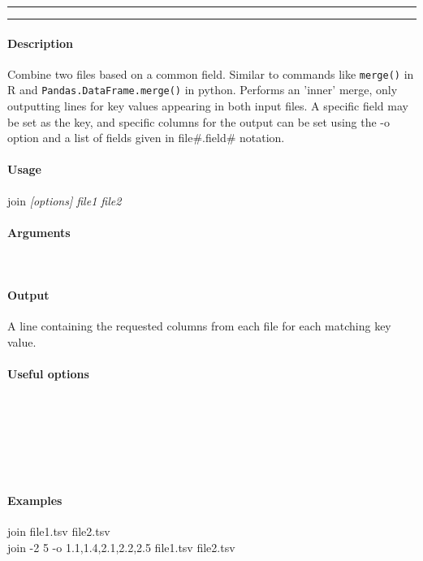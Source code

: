 \hrule
\vspace{1mm}
\hrule
\vspace{4mm}

\paragraph{Description}
\indentpar \raggedright \textrm{Combine two files based on a common field. Similar to commands like \texttt{merge()} in R and \texttt{Pandas.DataFrame.merge()} in python. Performs an 'inner' merge, only outputting lines for key values appearing in both input files.  A specific field may be set as the key, and specific columns for the output can be set using the -o option and a list of fields given in file\#.field\# notation.}\\

\paragraph{Usage}
\indentpar join \textit{[options] file1 file2}

\paragraph{Arguments}
\indentpar {}\\
\indentpar {}

\paragraph{Output}
A line containing the requested columns from each file for each matching key value.

\paragraph{Useful options}
\indentpar {}\\
\indentpar {}\\
\indentpar {}\\
\indentpar {}\\
\indentpar {}\\
\indentpar {}


\paragraph{Examples}

\indentpar join file1.tsv file2.tsv\\
\indentpar join -2 5 -o 1.1,1.4,2.1,2.2,2.5 file1.tsv file2.tsv

\vspace{20mm}